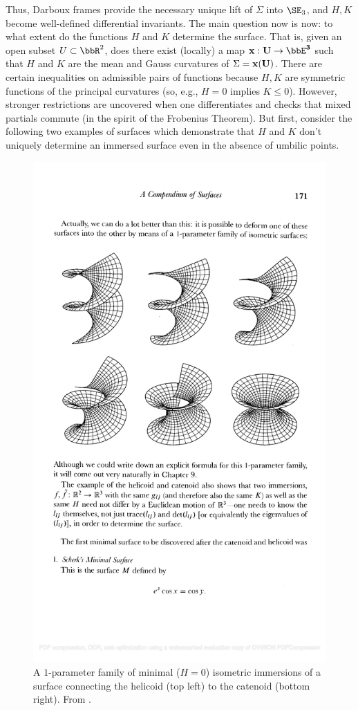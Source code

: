 Thus, Darboux frames provide the necessary unique lift of $\Sigma$ into $\SE_3$, and $H,K$ become well-defined differential invariants. The main question now is now: to what extent do the functions $H$ and $K$ determine the surface. That is, given an open subset $U\subset\bbR^2$, does there exist (locally) a map $\bf{x}:U\to \bbE^3$ such that $H$ and $K$ are the mean and Gauss curvatures of $\Sigma=\bf{x}(U)$. There are certain inequalities on admissible pairs of functions because $H,K$ are symmetric functions of the principal curvatures (so, e.g., $H=0$ implies $K\leq 0$). However, stronger restrictions are uncovered when one differentiates and checks that mixed partials commute (in the spirit of the Frobenius Theorem). But first, consider the following two examples of surfaces which demonstrate that $H$ and $K$ don't uniquely determine an immersed surface even in the absence of umbilic points.

\begin{figure}[tp]
    \centering
    \includegraphics[scale=0.5]{figures/helicoid.pdf}
    \caption{A $1$-parameter family of minimal ($H=0$) isometric immersions of a surface connecting the helicoid (top left) to the catenoid (bottom right). From \cite{Spivak3}.}
    \label{fig:helicoid}
\end{figure}

